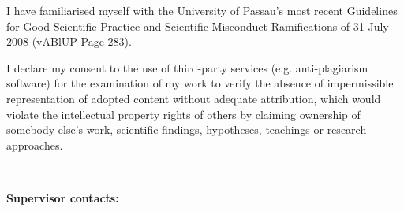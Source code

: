 I have familiarised myself with the University of Passau’s most recent Guidelines for Good Scientific Practice and Scientific Misconduct Ramifications of 31 July 2008 (vABlUP Page 283).

I declare my consent to the use of third-party services (e.g. anti-plagiarism software) for the examination of my work to verify the absence of impermissible representation of adopted content without adequate attribution, which would violate the intellectual property rights of others by claiming ownership of somebody else’s work, scientific findings, hypotheses, teachings or research approaches.

\cleardoublepage
~
\vfill


\textbf{Supervisor contacts:} \smallskip \\
\contactprofone\\
\contactproftwo\\

\cleardoublepage
